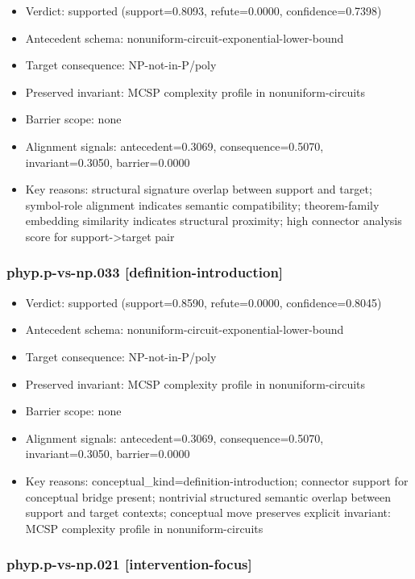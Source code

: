 \documentclass[
]{article}
\newcounter{none} %
\providecommand{\tightlist}{%
  \setlength{\itemsep}{0pt}\setlength{\parskip}{0pt}}
\begin{document}
\begin{itemize}
\tightlist
\item
  Verdict: supported (support=0.8093, refute=0.0000, confidence=0.7398)
\item
  Antecedent schema: nonuniform-circuit-exponential-lower-bound
\item
  Target consequence: NP-not-in-P/poly
\item
  Preserved invariant: MCSP complexity profile in nonuniform-circuits
\item
  Barrier scope: none
\item
  Alignment signals: antecedent=0.3069, consequence=0.5070,
  invariant=0.3050, barrier=0.0000
\item
  Key reasons: structural signature overlap between support and target;
  symbol-role alignment indicates semantic compatibility; theorem-family
  embedding similarity indicates structural proximity; high connector
  analysis score for support-\textgreater target pair
\end{itemize}

\subsubsection{phyp.p-vs-np.033
{[}definition-introduction{]}}\label{phypp-vs-np033-definition-introduction}

\begin{itemize}
\tightlist
\item
  Verdict: supported (support=0.8590, refute=0.0000, confidence=0.8045)
\item
  Antecedent schema: nonuniform-circuit-exponential-lower-bound
\item
  Target consequence: NP-not-in-P/poly
\item
  Preserved invariant: MCSP complexity profile in nonuniform-circuits
\item
  Barrier scope: none
\item
  Alignment signals: antecedent=0.3069, consequence=0.5070,
  invariant=0.3050, barrier=0.0000
\item
  Key reasons: conceptual\_kind=definition-introduction; connector
  support for conceptual bridge present; nontrivial structured semantic
  overlap between support and target contexts; conceptual move preserves
  explicit invariant: MCSP complexity profile in nonuniform-circuits
\end{itemize}

\subsubsection{phyp.p-vs-np.021
{[}intervention-focus{]}}\label{phypp-vs-np021-intervention-focus}
\end{document}
